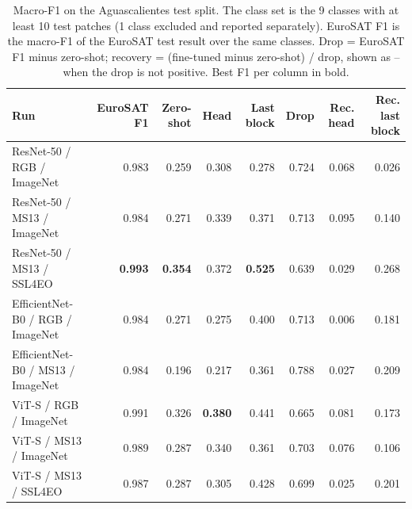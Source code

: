 \begin{table}[t]
\centering
\footnotesize
\caption{Macro-F1 on the Aguascalientes test split. The class set is the 9 classes with at least 10 test patches (1 class excluded and reported separately). EuroSAT F1 is the macro-F1 of the EuroSAT test result over the same classes. Drop = EuroSAT F1 minus zero-shot; recovery = (fine-tuned minus zero-shot) / drop, shown as -- when the drop is not positive. Best F1 per column in bold.}
\label{tab:ags}
\begin{tabular}{lrrrrrrr}
\toprule
Run & EuroSAT F1 & Zero-shot & Head & Last block & Drop & Rec. head & Rec. last block \\
\midrule
ResNet-50 / RGB / ImageNet & 0.983 & 0.259 & 0.308 & 0.278 & 0.724 & 0.068 & 0.026 \\
ResNet-50 / MS13 / ImageNet & 0.984 & 0.271 & 0.339 & 0.371 & 0.713 & 0.095 & 0.140 \\
ResNet-50 / MS13 / SSL4EO & \textbf{0.993} & \textbf{0.354} & 0.372 & \textbf{0.525} & 0.639 & 0.029 & 0.268 \\
EfficientNet-B0 / RGB / ImageNet & 0.984 & 0.271 & 0.275 & 0.400 & 0.713 & 0.006 & 0.181 \\
EfficientNet-B0 / MS13 / ImageNet & 0.984 & 0.196 & 0.217 & 0.361 & 0.788 & 0.027 & 0.209 \\
ViT-S / RGB / ImageNet & 0.991 & 0.326 & \textbf{0.380} & 0.441 & 0.665 & 0.081 & 0.173 \\
ViT-S / MS13 / ImageNet & 0.989 & 0.287 & 0.340 & 0.361 & 0.703 & 0.076 & 0.106 \\
ViT-S / MS13 / SSL4EO & 0.987 & 0.287 & 0.305 & 0.428 & 0.699 & 0.025 & 0.201 \\
\bottomrule
\end{tabular}
\end{table}
